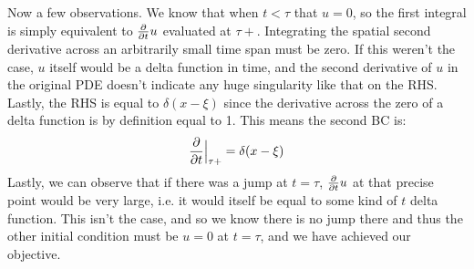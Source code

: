 \documentclass{article}
\begin{document}
Now a few observations. We know that when $t<\tau$ that $u=0$, so the first integral is simply equivalent to $\pdv{}{t}u$ evaluated at $\tau+$. Integrating the spatial second derivative across an arbitrarily small time span must be zero. If this weren't the case, $u$ itself would be a delta function in time, and the second derivative of $u$ in the original PDE doesn't indicate any huge singularity like that on the RHS. Lastly, the RHS is equal to $\delta(x-\xi)$ since the derivative across the zero of a delta function is by definition equal to 1. This means the second BC is:
\begin{equation}
\begin{aligned}
\pdv{}{t} \Big{|}_{\tau +} = \delta(x-\xi)
\end{aligned}
\end{equation}
Lastly, we can observe that if there was a jump at $t=\tau$, $\pdv{}{t}u$ at that precise point would be very large, i.e. it would itself be equal to some kind of $t$ delta function. This isn't the case, and so we know there is no jump there and thus the other initial condition must be $u=0$ at $t=\tau$, and we have achieved our objective.
\end{document}
